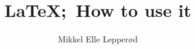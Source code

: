 
\title{\LaTeX;\, How to use it}
\author{Mikkel Elle Lepper\o{}d}

\maketitle


\clearpage\thispagestyle{empty}
\tableofcontents
\newpage
\renewcommand{\headrulewidth}{.5pt}
\newpage
{}



\newpage\appendix
\begin{appendices}

\end{appendices}
\newpage
\pagestyle{empty}


\listoftodos

